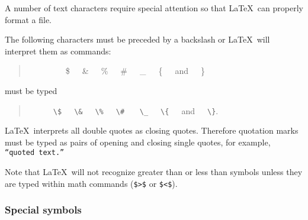 \documentclass{gji}
\begin{document}
A number of text characters require special attention
so that \LaTeX\ can properly format a file.

The following characters must be preceded by a
backslash or \LaTeX\ will interpret them as commands:
\begin{quote}
~~~~~~~~~\$~~~\&~~~\%~~~\#~~~\_~~~\{~~~and~~~\}
\end{quote}
must be typed
\begin{center}
\begin{quote}
~~~~~~\verb"\$"~~~\verb"\&"~~~\verb"\%"~~~\verb"\#"
~~~\verb"\_"~~~\verb"\{"~~~and~~~\verb"\}".
\end{quote}
\end{center}

\LaTeX\ interprets all double quotes as closing quotes.
Therefore quotation marks must be typed as pairs of
opening and closing single quotes, for example,
\texttt{ ``quoted text.''}

Note that \LaTeX\ will not recognize greater than or
less than symbols unless they are typed within math
commands (\verb"$>$" or \verb"$<$").

\subsubsection{Special symbols}
\end{document}
